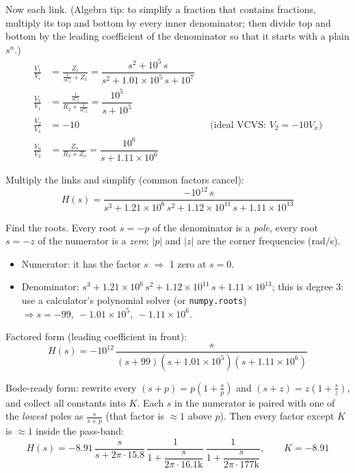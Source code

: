 \documentclass[11pt]{article}
\newcommand{\solstep}[2]{\par\medskip{\color{stepc}\textbf{Step #1 --- #2}}\par\nopagebreak}
\begin{document}
Now each link. {\small (Algebra tip: to simplify a fraction that contains fractions, multiply its top and bottom by every inner denominator; then divide top and bottom by the leading coefficient of the denominator so that it starts with a plain $s^n$.)}
\begin{align*}
\frac{V_{1}}{V_{i}} &= \frac{Z_{1}}{\frac{1}{sC_{1}} + Z_{1}} = \dfrac{s^{2} + 10^{5}\,s}{s^{2} + 1.01\times 10^{5}\,s + 10^{7}} \\
\frac{V_{x}}{V_{1}} &= \frac{\frac{1}{sC_{2}}}{R_{2} + \frac{1}{sC_{2}}} = \dfrac{10^{5}}{s + 10^{5}} \\
\frac{V_{2}}{V_{x}} &= -10 &&\text{(ideal VCVS: $V_{2} = -10V_{x}$)} \\
\frac{V_{o}}{V_{2}} &= \frac{Z_{o}}{R_{3} + Z_{o}} = \dfrac{10^{6}}{s + 1.11\times 10^{6}}
\end{align*}

Multiply the links and simplify (common factors cancel):\[
H(s) = \dfrac{-10^{12}\,s}{s^{3} + 1.21\times 10^{6}\,s^{2} + 1.12\times 10^{11}\,s + 1.11\times 10^{13}}
\]

\solstep{5}{Standard (Bode-ready) form}Find the roots. Every root $s=-p$ of the denominator is a \emph{pole}, every root $s=-z$ of the numerator is a \emph{zero}; $|p|$ and $|z|$ are the corner frequencies (rad/s).
\begin{itemize}[leftmargin=*,itemsep=2pt]
\item Numerator: it has the factor $s$ $\Rightarrow$ 1 zero at $s=0$.
\item Denominator: $s^{3} + 1.21\times 10^{6}\,s^{2} + 1.12\times 10^{11}\,s + 1.11\times 10^{13}$; this is degree 3: use a calculator's polynomial solver (or \texttt{numpy.roots}) $\Rightarrow s = -99,\ -1.01\times 10^{5},\ -1.11\times 10^{6}$.
\end{itemize}

Factored form (leading coefficient in front):
\[
H(s) = -10^{12}\,\dfrac{s}{(s+99)(s+1.01\times 10^{5})(s+1.11\times 10^{6})}
\]

Bode-ready form: rewrite every $(s+p) = p\left(1+\frac{s}{p}\right)$ and $(s+z) = z\left(1+\frac{s}{z}\right)$, and collect all constants into $K$. Each $s$ in the numerator is paired with one of the \emph{lowest} poles as $\frac{s}{s+p}$ (that factor is $\approx 1$ above $p$). Then every factor except $K$ is $\approx 1$ inside the pass-band:
\[
H(s) = -8.91\,\dfrac{s}{s+2\pi\cdot 15.8}\,\dfrac{1}{1+\dfrac{s}{2\pi\cdot 16.1\mathrm{k}}}\,\dfrac{1}{1+\dfrac{s}{2\pi\cdot 177\mathrm{k}}},\qquad K = -8.91
\]
\end{document}
